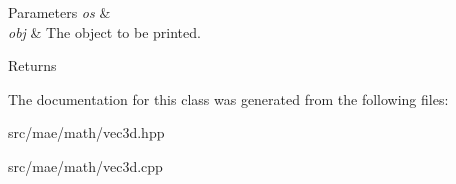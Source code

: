 \begin{DoxyParams}{Parameters}
{\em os} & \\
\hline
{\em obj} & The object to be printed. \\
\hline
\end{DoxyParams}
\begin{DoxyReturn}{Returns}

\end{DoxyReturn}


The documentation for this class was generated from the following files\-:\begin{DoxyCompactItemize}
\item 
src/mae/math/vec3d.\-hpp\item 
src/mae/math/vec3d.\-cpp\end{DoxyCompactItemize}
